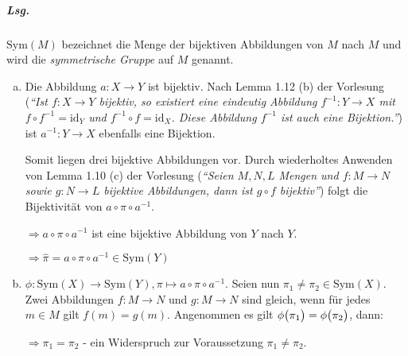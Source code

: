 \documentclass{scrreprt}
\newcommand\Sym{\text{Sym}}
\begin{document}
\subparagraph{Lsg.} $\Sym(M)$ bezeichnet die Menge der bijektiven Abbildungen
von $M$ nach $M$ und wird die \emph{symmetrische Gruppe} auf $M$ genannt.
\begin{enumerate}[(a)]
\item Die Abbildung $a \colon X \to Y$ ist bijektiv.
  Nach Lemma 1.12 (b) der Vorlesung \label{lemma:1.12b}
  (\emph{``Ist $f \colon X \to Y$ bijektiv,
    so existiert eine eindeutig Abbildung $f^{-1} \colon Y \to X$ mit
    $f \circ f^{-1} = \text{id}_Y$ und $f^{-1} \circ f = \text{id}_{X}$.
    Diese Abbildung $f^{-1}$ ist auch eine Bijektion.''})
  ist $a^{-1} \colon Y \to X$ ebenfalls eine Bijektion.

  Somit liegen drei bijektive Abbildungen vor.
  Durch wiederholtes Anwenden von Lemma 1.10 (c) der Vorlesung
  \label{lemma:1.10c}
  (\emph{``Seien $M, N, L$ Mengen und $f \colon M \to N$ sowie
    $g \colon N \to L$ bijektive Abbildungen, dann ist $g \circ f$
    bijektiv''}) folgt die Bijektivität von $a \circ \pi \circ a^{-1}$.

  $\Rightarrow a \circ \pi \circ a^{-1}$ ist eine bijektive Abbildung von $Y$
  nach $Y$.

  $\Rightarrow \hat\pi = a \circ \pi \circ a^{-1} \in \Sym(Y)$

\item $\phi \colon \Sym(X) \to \Sym(Y), \pi \mapsto a \circ \pi \circ a^{-1}$.
  Seien nun $\pi_1 \ne \pi_2 \in \Sym(X)$.
  Zwei Abbildungen $f \colon M \to N$ und $g \colon M \to N$ sind gleich, wenn
  für jedes $m \in M$ gilt $f(m) = g(m)$.
  Angenommen es gilt $\phi\qty\big(\pi_1) = \phi\qty\big(\pi_2)$, dann:
  $\Rightarrow \pi_1 = \pi_2$ - ein Widerspruch zur Voraussetzung
  $\pi_1 \ne \pi_2$.


\end{enumerate}
\end{document}
